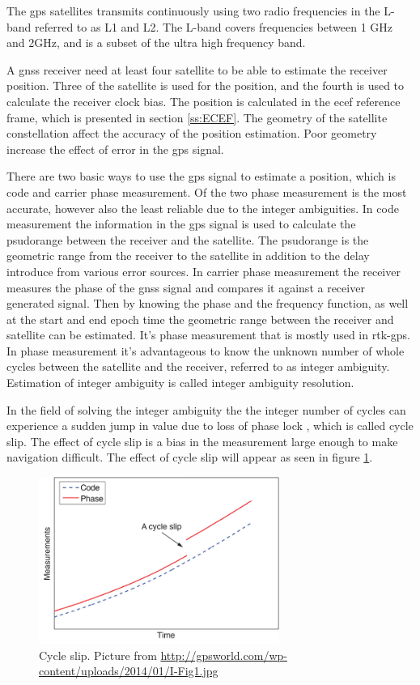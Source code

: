 The \gls{gps} satellites transmits continuously using two radio frequencies in the L-band referred to as L1 and L2. The L-band covers frequencies between 1 GHz and 2GHz, and is a subset of the ultra high frequency band.

A \gls{gnss} receiver need at least four satellite to be able to estimate the receiver position. Three of the satellite is used for the position, and the fourth is used to calculate the receiver clock bias. The position is calculated in the \gls{ecef} reference frame, which is presented in section \ref{ss:ECEF}. The geometry of the satellite constellation affect the accuracy of the position estimation. Poor geometry increase the effect of error in the \gls{gps} signal.

There are two basic ways to use the \gls{gps} signal to estimate a position, which is code and carrier phase measurement. Of the two phase measurement is the most accurate, however also the least reliable due to the integer ambiguities. In code measurement the information in the \gls{gps} signal is used to calculate the psudorange between the receiver and the satellite. The psudorange is the geometric range from the receiver to the satellite in addition to the delay introduce from various error sources. In carrier phase measurement the receiver measures the phase of the \gls{gnss} signal and compares it against a receiver generated signal. Then by knowing the phase and the frequency function, as well at the start and end epoch time the geometric range between the receiver and satellite can be estimated. It's phase measurement that is mostly used in \gls{rtk-gps}. In phase measurement it's advantageous to know the unknown number of whole cycles between the satellite and the receiver, referred to as integer ambiguity. Estimation of integer ambiguity is called integer ambiguity resolution.

In the field of solving the integer ambiguity the the integer number of cycles can experience a sudden jump in value due to loss of phase lock , which is called cycle slip. The effect of cycle slip is a bias in the measurement large enough to make navigation difficult. The effect of cycle slip will appear as seen in figure \ref{figure:CycleSlip}.
\begin{figure}[H]
	\centering
		\includegraphics[width=0.7\textwidth]{figs/cycleSlip.jpg}
		\caption{Cycle slip. Picture from \url{http://gpsworld.com/wp-content/uploads/2014/01/I-Fig1.jpg}}
		\label{figure:CycleSlip}
\end{figure}

